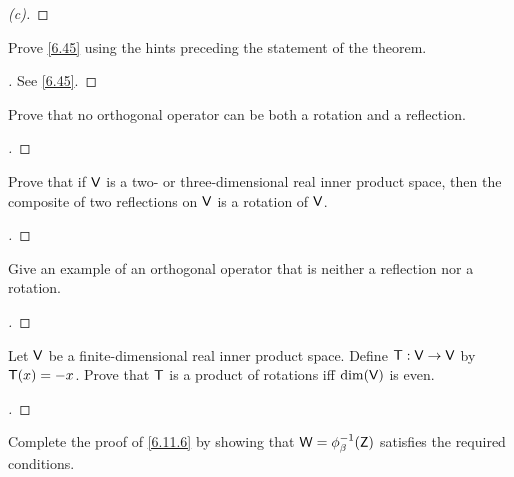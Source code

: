 \begin{proof}[(c)]

\end{proof}

\begin{ex}\label{ex:6.11.8}
  Prove \cref{6.45} using the hints preceding the statement of the theorem.
\end{ex}

\begin{proof}[]
  See \cref{6.45}.
\end{proof}

\begin{ex}\label{ex:6.11.9}
  Prove that no orthogonal operator can be both a rotation and a reflection.
\end{ex}

\begin{proof}[]

\end{proof}

\begin{ex}\label{ex:6.11.10}
  Prove that if \(\mathsf{V}\) is a two- or three-dimensional real inner product space, then the composite of two reflections on \(\mathsf{V}\) is a rotation of \(\mathsf{V}\).
\end{ex}

\begin{proof}[]

\end{proof}

\begin{ex}\label{ex:6.11.11}
  Give an example of an orthogonal operator that is neither a reflection nor a rotation.
\end{ex}

\begin{proof}[]

\end{proof}

\begin{ex}\label{ex:6.11.12}
  Let \(\mathsf{V}\) be a finite-dimensional real inner product space.
  Define \(\mathsf{T} : \mathsf{V} \to \mathsf{V}\) by \(\mathsf{T}(x) = -x\).
  Prove that \(\mathsf{T}\) is a product of rotations iff \(\dim(\mathsf{V})\) is even.
\end{ex}

\begin{proof}[]

\end{proof}

\begin{ex}\label{ex:6.11.13}
  Complete the proof of \cref{6.11.6} by showing that \(\mathsf{W} = \phi_{\beta}^{-1}(\mathsf{Z})\) satisfies the required conditions.
\end{ex}

